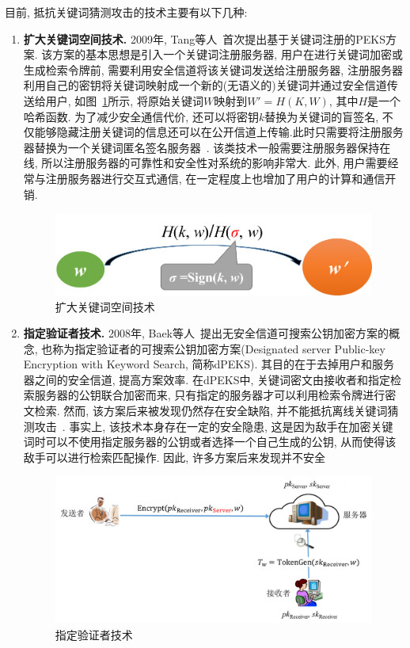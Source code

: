 目前, 抵抗关键词猜测攻击的技术主要有以下几种:
\begin{enumerate}
\item \textbf{扩大关键词空间技术.} 2009年, Tang等人~\cite{TC-EuroPKI-2009}首次提出基于关键词注册的PEKS方案. 该方案的基本思想是引入一个关键词注册服务器, 用户在进行关键词加密或生成检索令牌前, 需要利用安全信道将该关键词发送给注册服务器, 注册服务器利用自己的密钥将关键词映射成一个新的(无语义的)关键词并通过安全信道传送给用户, 如图~\ref{fig:ch6-RegPEKS}所示, 将原始关键词$W$映射到$W' = H(K, W)$, 其中$H$是一个哈希函数. 为了减少安全通信代价, 还可以将密钥$k$替换为关键词的盲签名, 不仅能够隐藏注册关键词的信息还可以在公开信道上传输.此时只需要将注册服务器替换为一个关键词匿名签名服务器~\cite{CMYGHWW-TIFS-2016}. 该类技术一般需要注册服务器保持在线, 所以注册服务器的可靠性和安全性对系统的影响非常大. 此外, 用户需要经常与注册服务器进行交互式通信, 在一定程度上也增加了用户的计算和通信开销.
\begin{figure}[h]
\centering
\includegraphics[scale = 0.5]{figure/ch6-RegPEKS.png}
\caption{扩大关键词空间技术} \label{fig:ch6-RegPEKS}
\end{figure}

\item \textbf{指定验证者技术.} 2008年, Baek等人~\cite{BSS2008}提出无安全信道可搜索公钥加密方案的概念, 也称为指定验证者的可搜索公钥加密方案(Designated server Public-key Encryption with Keyword Search, 简称dPEKS). 其目的在于去掉用户和服务器之间的安全信道, 提高方案效率. 在dPEKS中, 关键词密文由接收者和指定检索服务器的公钥联合加密而来, 只有指定的服务器才可以利用检索令牌进行密文检索. 然而, 该方案后来被发现仍然存在安全缺陷, 并不能抵抗离线关键词猜测攻击~\cite{RPSL2009}. 事实上, 该技术本身存在一定的安全隐患, 这是因为敌手在加密关键词时可以不使用指定服务器的公钥或者选择一个自己生成的公钥, 从而使得该敌手可以进行检索匹配操作. 因此, 许多方案后来发现并不安全~\cite{YPHG-IJCM-2013,NKE2018}
\begin{figure}[h]
\centering
\includegraphics[scale = 0.5]{figure/ch6-dPEKS.png}
\caption{指定验证者技术} \label{fig:ch6-dPEKS}
\end{figure}


\end{enumerate}
